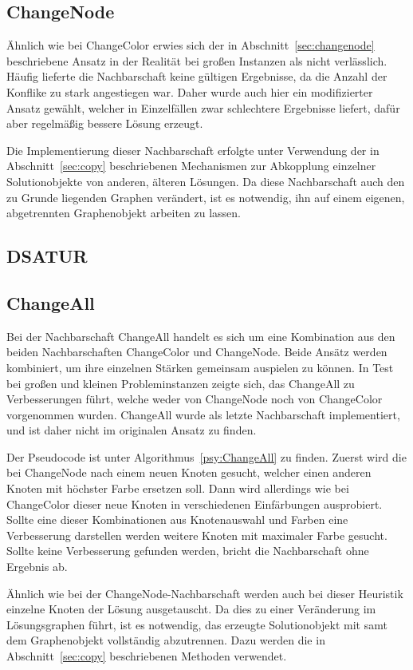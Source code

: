 \subsection{ChangeNode}
Ähnlich wie bei ChangeColor erwies sich der in Abschnitt~\ref{sec:changenode} beschriebene Ansatz in der Realität bei großen Instanzen als nicht verlässlich. Häufig lieferte die Nachbarschaft keine gültigen
Ergebnisse, da die Anzahl der Konflike zu stark angestiegen war. Daher wurde auch hier ein modifizierter Ansatz gewählt, welcher in Einzelfällen zwar schlechtere Ergebnisse liefert, dafür aber regelmäßig
bessere Lösung erzeugt.

Die Implementierung dieser Nachbarschaft erfolgte unter Verwendung der in Abschnitt~\ref{sec:copy} beschriebenen Mechanismen zur Abkopplung einzelner Solutionobjekte von anderen, älteren Lösungen. Da diese 
Nachbarschaft auch den zu Grunde liegenden Graphen verändert, ist es notwendig, ihn auf einem eigenen, abgetrennten Graphenobjekt arbeiten zu lassen. 

\subsection{DSATUR}
\subsection{ChangeAll}
Bei der Nachbarschaft ChangeAll handelt es sich um eine Kombination aus den beiden Nachbarschaften ChangeColor und ChangeNode. Beide Ansätz werden kombiniert, um ihre einzelnen Stärken gemeinsam auspielen
zu können. In Test bei großen und kleinen Probleminstanzen zeigte sich, das ChangeAll zu Verbesserungen führt, welche weder von ChangeNode noch von ChangeColor vorgenommen wurden. ChangeAll wurde als letzte
Nachbarschaft implementiert, und ist daher nicht im originalen Ansatz zu finden.

Der Pseudocode ist unter Algorithmus~\ref{psy:ChangeAll} zu finden. Zuerst wird die bei ChangeNode nach einem neuen Knoten gesucht, welcher einen anderen Knoten mit höchster Farbe ersetzen soll. Dann wird
allerdings wie bei ChangeColor dieser neue Knoten in verschiedenen Einfärbungen ausprobiert. Sollte eine dieser Kombinationen aus Knotenauswahl und Farben eine Verbesserung darstellen werden weitere Knoten
mit maximaler Farbe gesucht. Sollte keine Verbesserung gefunden werden, bricht die Nachbarschaft ohne Ergebnis ab.

Ähnlich wie bei der ChangeNode-Nachbarschaft werden auch bei dieser Heuristik einzelne Knoten der Lösung ausgetauscht. Da dies zu einer Veränderung im Lösungsgraphen führt, ist es notwendig, das erzeugte
Solutionobjekt mit samt dem Graphenobjekt vollständig abzutrennen. Dazu werden die in Abschnitt~\ref{sec:copy} beschriebenen Methoden verwendet.

